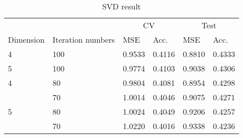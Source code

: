 \begin{table}
\centering
\caption{SVD result}
\label{tab:results.svd}
\begin{tabular}{llllll}
\toprule
  &     &   \multicolumn{2}{c}{CV} & \multicolumn{2}{c}{Test}\\
  \cmidrule(lr){3-4}\cmidrule(lr){5-6}
Dimension & Iteration numbers &        MSE & Acc. & MSE & Acc.  \\
\midrule
4 & 100 &  0.9533 &      0.4116 &   0.8810 &        0.4333 \\
5 & 100 &  0.9774 &      0.4103 &   0.9038 &        0.4306 \\
4 & 80  &  0.9804 &      0.4081 &   0.8954 &        0.4298 \\
  & 70  &  1.0014 &      0.4046 &   0.9075 &        0.4271 \\
5 & 80  &  1.0024 &      0.4049 &   0.9206 &        0.4257 \\
  & 70  &  1.0220 &      0.4016 &   0.9338 &        0.4236 \\
\bottomrule
\end{tabular}
\end{table}
